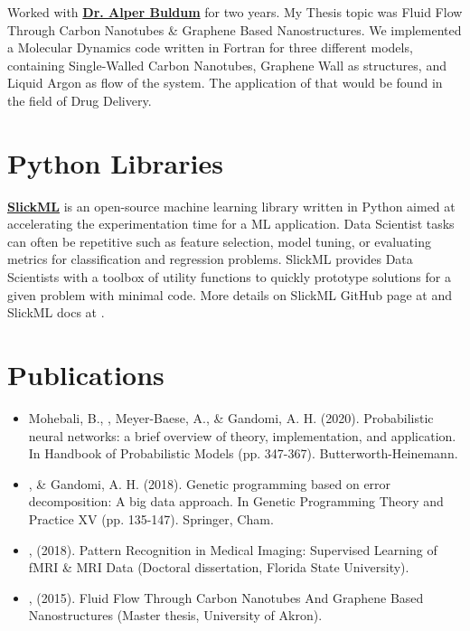 \documentclass[]{template}
\begin{document}
\sectionsep

Worked with \textbf{\href{https://www.uakron.edu/physics/faculty-staff/bio-detail.dot?u=buldum}{Dr. Alper Buldum}} for two years. My Thesis topic was Fluid Flow Through Carbon Nanotubes \& Graphene Based Nanostructures. We implemented a Molecular Dynamics code written in Fortran for three different models, containing Single-Walled Carbon Nanotubes, Graphene Wall as structures, and Liquid Argon as flow of the system. The application of that would be found in the field of Drug Delivery.
\sectionsep
\hline
\sectionsep
\section{Python Libraries}
\sectionsep
{}
\textbf{\href{https://github.com/slickml/slick-ml}{SlickML}} is an open-source machine learning library written in Python aimed at accelerating the experimentation time for a ML application. Data Scientist tasks can often be repetitive such as feature selection, model tuning, or evaluating metrics for classification and regression problems. SlickML provides Data Scientists with a toolbox of utility functions to quickly prototype solutions for a given problem with minimal code. More details on SlickML GitHub page at  and SlickML docs at .


\sectionsep
\hline
\sectionsep
\section{Publications}
\sectionsep
{}
\sectionsep
\begin{itemize}

\item Mohebali, B., , Meyer-Baese, A., \& Gandomi, A. H. (2020). Probabilistic neural networks: a brief overview of theory, implementation, and application. In Handbook of Probabilistic Models (pp. 347-367). Butterworth-Heinemann.

\item {}, \& Gandomi, A. H. (2018). Genetic programming based on error decomposition: A big data approach. In Genetic Programming Theory and Practice XV (pp. 135-147). Springer, Cham.


\item {}, (2018). Pattern Recognition in Medical Imaging: Supervised Learning of fMRI \& MRI Data (Doctoral dissertation, Florida State University).

\item {}, (2015). Fluid Flow Through Carbon Nanotubes And Graphene Based Nanostructures (Master thesis, University of Akron).


\end{itemize}
\end{document}
